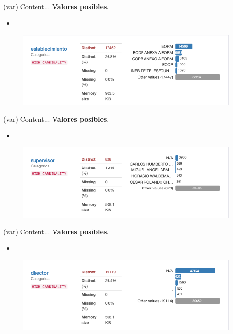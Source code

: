 
\begin{variable}(var) 
Content... 
\bigbreak 
\textbf{Valores posibles.}
\begin{itemize}
	\item 
\end{itemize}
\begin{figure}[H]
	\centering
	\includegraphics[scale=0.5]{Images/5}
\end{figure}
\end{variable}


\begin{variable}(var) 
Content... 
\bigbreak 
\textbf{Valores posibles.}
\begin{itemize}
	\item 
\end{itemize}
\begin{figure}[H]
	\centering
	\includegraphics[scale=0.5]{Images/6}
\end{figure}
\end{variable}


\begin{variable}(var) 
Content... 
\bigbreak 
\textbf{Valores posibles.}
\begin{itemize}
	\item 
\end{itemize}
\begin{figure}[H]
	\centering
	\includegraphics[scale=0.5]{Images/7}
\end{figure}
\end{variable}

